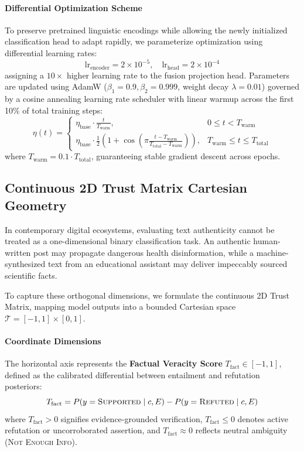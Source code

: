 \paragraph{Differential Optimization Scheme}
To preserve pretrained linguistic encodings while allowing the newly initialized classification head to adapt rapidly, we parameterize optimization using differential learning rates:
\begin{equation}
\label{eq:differential_lr}
\text{lr}_{\text{encoder}} = 2 \times 10^{-5}, \quad \text{lr}_{\text{head}} = 2 \times 10^{-4}
\end{equation}
assigning a $10\times$ higher learning rate to the fusion projection head. Parameters are updated using AdamW ($\beta_1 = 0.9, \beta_2 = 0.999$, weight decay $\lambda = 0.01$) governed by a cosine annealing learning rate scheduler with linear warmup across the first 10\% of total training steps:
\begin{equation}
\label{eq:cosine_schedule}
\eta(t) = \begin{cases}
\eta_{\text{base}} \cdot \frac{t}{T_{\text{warm}}}, & 0 \le t < T_{\text{warm}} \\
\eta_{\text{base}} \cdot \frac{1}{2} \left(1 + \cos\left(\pi \frac{t - T_{\text{warm}}}{T_{\text{total}} - T_{\text{warm}}}\right)\right), & T_{\text{warm}} \le t \le T_{\text{total}}
\end{cases}
\end{equation}
where $T_{\text{warm}} = 0.1 \cdot T_{\text{total}}$, guaranteeing stable gradient descent across epochs.

\subsection{Continuous 2D Trust Matrix Cartesian Geometry}
\label{sec:trust_matrix_formulation}
In contemporary digital ecosystems, evaluating text authenticity cannot be treated as a one-dimensional binary classification task. An authentic human-written post may propagate dangerous health disinformation, while a machine-synthesized text from an educational assistant may deliver impeccably sourced scientific facts.

To capture these orthogonal dimensions, we formulate the continuous 2D Trust Matrix, mapping model outputs into a bounded Cartesian space $\mathcal{T} = [-1, 1] \times [0, 1]$.

\paragraph{Coordinate Dimensions}
The horizontal axis represents the \textbf{Factual Veracity Score} $T_{\text{fact}} \in [-1, 1]$, defined as the calibrated differential between entailment and refutation posteriors:
\begin{equation}
\label{eq:trust_fact}
T_{\text{fact}} = P(y = \textsc{Supported} \mid c, E) - P(y = \textsc{Refuted} \mid c, E)
\end{equation}
where $T_{\text{fact}} > 0$ signifies evidence-grounded verification, $T_{\text{fact}} \le 0$ denotes active refutation or uncorroborated assertion, and $T_{\text{fact}} \approx 0$ reflects neutral ambiguity (\textsc{Not Enough Info}).

